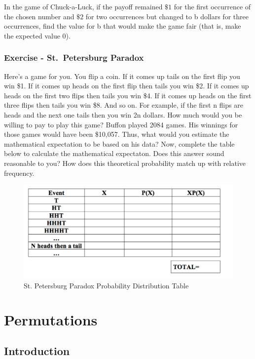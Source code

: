 \documentclass[]{book}
\theoremstyle{definition}
\theoremstyle{definition}
\theoremstyle{definition}
\theoremstyle{remark}
\begin{document}
In the game of Chuck-a-Luck, if the payoff remained \(\$1\) for the
first occurrence of the chosen number and \(\$2\) for two occurrences
but changed to b dollars for three occurrences, find the value for b
that would make the game fair (that is, make the expected value 0).

\subsection{Exercise - St.~Petersburg
Paradox}\label{exercise---st.petersburg-paradox}

Here's a game for you. You flip a coin. If it comes up tails on the
first flip you win \$1. If it comes up heads on the first flip then
tails you win \$2. If it comes up heads on the first two flips then
tails you win \$4. If it comes up heads on the first three flips then
tails you win \$8. And so on. For example, if the first n flips are
heads and the next one tails then you win 2n dollars. How much would you
be willing to pay to play this game? Buffon played 2084 games. His
winnings for those games would have been \$10,057. Thus, what would you
estimate the mathematical expectation to be based on his data? Now,
complete the table below to calculate the mathematical expectaton. Does
this answer sound reasonable to you? How does this theoretical
probability match up with relative frequency.

\begin{figure}

{\centering \includegraphics[width=0.3\linewidth]{01-basics-figures/st_petersburg_table} 

}

\caption{St. Petersburg Paradox Probability Distribution Table}\label{fig:nice-fig-83}
\end{figure}

\chapter{Permutations}\label{permutations}

\section{Introduction}\label{introduction}
\end{document}
